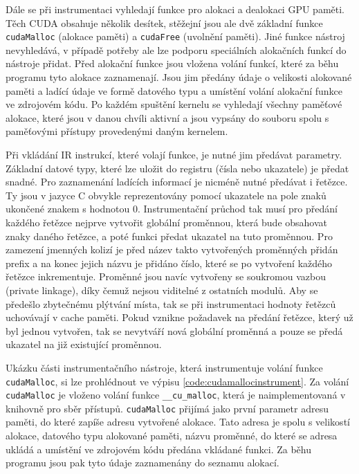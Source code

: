 Dále se při instrumentaci vyhledají funkce pro alokaci a dealokaci GPU paměti. Těch CUDA obsahuje několik desítek, stěžejní jsou ale dvě základní funkce \texttt{cudaMalloc} (alokace paměti) a \texttt{cudaFree} (uvolnění paměti). Jiné funkce nástroj nevyhledává, v případě potřeby ale lze podporu speciálních alokačních funkcí do nástroje přidat. Před alokační funkce jsou vložena volání funkcí, které za běhu programu tyto alokace zaznamenají. Jsou jim předány údaje o velikosti alokované paměti a ladící údaje ve formě datového typu a umístění volání alokační funkce ve zdrojovém kódu. Po každém spuštění kernelu se vyhledají všechny paměťové alokace, které jsou v danou chvíli aktivní a jsou vypsány do souboru spolu s paměťovými přístupy provedenými daným kernelem.

Při vkládání IR instrukcí, které volají funkce, je nutné jim předávat parametry. Základní datové typy, které lze uložit do registru (čísla nebo ukazatele) je předat snadné. Pro zaznamenání ladících informací je nicméně nutné předávat i řetězce. Ty jsou v jazyce C obvykle reprezentovány pomocí ukazatele na pole znaků ukončené znakem s hodnotou 0. Instrumentační průchod tak musí pro předání každého řetězce nejprve vytvořit globální proměnnou, která bude obsahovat znaky daného řetězce, a poté funkci předat ukazatel na tuto proměnnou. Pro zamezení jmenných kolizí je před název takto vytvořených proměnných přidán prefix a na konec jejich názvu je přidáno číslo, které se po vytvoření každého řetězce inkrementuje. Proměnné jsou navíc vytvořeny se soukromou vazbou (private linkage), díky čemuž nejsou viditelné z ostatních modulů. Aby se předešlo zbytečnému plýtvání místa, tak se při instrumentaci hodnoty řetězců uchovávají v cache paměti. Pokud vznikne požadavek na předání řetězce, který už byl jednou vytvořen, tak se nevytváří nová globální proměnná a pouze se předá ukazatel na již existující proměnnou.

Ukázku části instrumentačního nástroje, která instrumentuje volání funkce \texttt{cudaMalloc}, si lze prohlédnout ve výpisu \ref{code:cudamallocinstrument}. Za volání \texttt{cudaMalloc} je vloženo volání funkce \texttt{\_\_cu\_malloc}, která je naimplementovaná v knihovně pro sběr přístupů. \texttt{cudaMalloc} přijímá jako první parametr adresu paměti, do které zapíše adresu vytvořené alokace. Tato adresa je spolu s velikostí alokace, datového typu alokované paměti, názvu proměnné, do které se adresa ukládá a umístění ve zdrojovém kódu předána vkládané funkci. Za běhu programu jsou pak tyto údaje zaznamenány do seznamu alokací.

